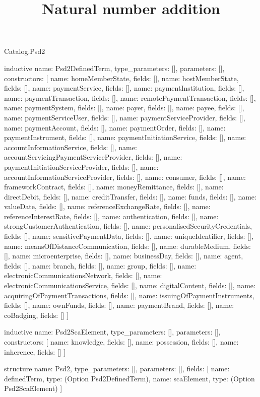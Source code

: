 \begin{lexlean}{Catalog.Psd2}
\title{Natural number addition}
\begin{semanticmodule}
inductive{
  name: Psd2DefinedTerm,
  type_parameters: [],
  parameters: [],
  constructors: [
    {name: homeMemberState, fields: []},
    {name: hostMemberState, fields: []},
    {name: paymentService, fields: []},
    {name: paymentInstitution, fields: []},
    {name: paymentTransaction, fields: []},
    {name: remotePaymentTransaction, fields: []},
    {name: paymentSystem, fields: []},
    {name: payer, fields: []},
    {name: payee, fields: []},
    {name: paymentServiceUser, fields: []},
    {name: paymentServiceProvider, fields: []},
    {name: paymentAccount, fields: []},
    {name: paymentOrder, fields: []},
    {name: paymentInstrument, fields: []},
    {name: paymentInitiationService, fields: []},
    {name: accountInformationService, fields: []},
    {name: accountServicingPaymentServiceProvider, fields: []},
    {name: paymentInitiationServiceProvider, fields: []},
    {name: accountInformationServiceProvider, fields: []},
    {name: consumer, fields: []},
    {name: frameworkContract, fields: []},
    {name: moneyRemittance, fields: []},
    {name: directDebit, fields: []},
    {name: creditTransfer, fields: []},
    {name: funds, fields: []},
    {name: valueDate, fields: []},
    {name: referenceExchangeRate, fields: []},
    {name: referenceInterestRate, fields: []},
    {name: authentication, fields: []},
    {name: strongCustomerAuthentication, fields: []},
    {name: personalisedSecurityCredentials, fields: []},
    {name: sensitivePaymentData, fields: []},
    {name: uniqueIdentifier, fields: []},
    {name: meansOfDistanceCommunication, fields: []},
    {name: durableMedium, fields: []},
    {name: microenterprise, fields: []},
    {name: businessDay, fields: []},
    {name: agent, fields: []},
    {name: branch, fields: []},
    {name: group, fields: []},
    {name: electronicCommunicationsNetwork, fields: []},
    {name: electronicCommunicationsService, fields: []},
    {name: digitalContent, fields: []},
    {name: acquiringOfPaymentTransactions, fields: []},
    {name: issuingOfPaymentInstruments, fields: []},
    {name: ownFunds, fields: []},
    {name: paymentBrand, fields: []},
    {name: coBadging, fields: []}
  ]
}

inductive{
  name: Psd2ScaElement,
  type_parameters: [],
  parameters: [],
  constructors: [
    {name: knowledge, fields: []},
    {name: possession, fields: []},
    {name: inherence, fields: []}
  ]
}

structure{
  name: Psd2,
  type_parameters: [],
  parameters: [],
  fields: [
    {name: definedTerm, type: (Option Psd2DefinedTerm)},
    {name: scaElement, type: (Option Psd2ScaElement)}
  ]
}
\end{semanticmodule}
\end{lexlean}
